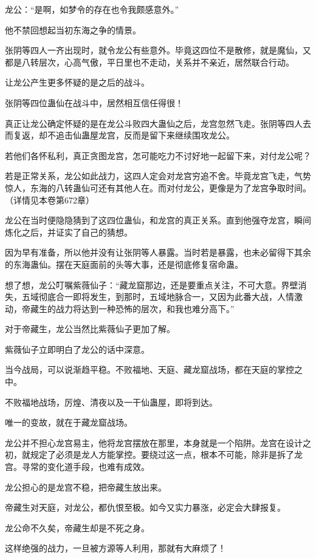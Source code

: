 \begin{this_body}
龙公：“是啊，如梦令的存在也令我颇感意外。”

他不禁回想起当初东海之争的情景。

张阴等四人一齐出现时，就令龙公有些意外。毕竟这四位不是散修，就是魔仙，又都是八转层次，心高气傲，平日里也不走动，关系并不亲近，居然联合行动。

让龙公产生更多怀疑的是之后的战斗。

张阴等四位蛊仙在战斗中，居然相互信任得很！

真正让龙公确定怀疑的是在龙公斗败四大蛊仙之后，龙宫忽然飞走。张阴等四人去而复返，却不追击仙蛊屋龙宫，反而是留下来继续围攻龙公。

若他们各怀私利，真正贪图龙宫，怎可能吃力不讨好地一起留下来，对付龙公呢？

若是正常关系，龙公如此战力，这四人定会对龙宫穷追不舍。毕竟龙宫飞走，气势惊人，东海的八转蛊仙可还有其他人在。而对付龙公，更像是为了龙宫争取时间。（详情见本卷第672章）

龙公在当时便隐隐猜到了这四位蛊仙，和龙宫的真正关系。直到他强夺龙宫，瞬间炼化之后，并证实了自己的猜想。

因为早有准备，所以他并没有让张阴等人暴露。当时若是暴露，也未必留得下其余的东海蛊仙。摆在天庭面前的头等大事，还是彻底修复宿命蛊。

想了想，龙公叮嘱紫薇仙子：“藏龙窟那边，还是要重点关注，不可大意。界壁消失，五域彻底合一即将发生，到那时，五域地脉合一，又因为此番大战，人情激动，帝藏生的战力将达到一种恐怖的层次，和我也难分高下。”

对于帝藏生，龙公当然比紫薇仙子更加了解。

紫薇仙子立即明白了龙公的话中深意。

当今战局，可以说渐趋平稳。不败福地、天庭、藏龙窟战场，都在天庭的掌控之中。

不败福地战场，厉煌、清夜以及一干仙蛊屋，即将到达。

唯一的变故，就在于藏龙窟战场。

龙公并不担心龙宫易主，他将龙宫摆放在那里，本身就是一个陷阱。龙宫在设计之初，就规定了必须是龙人方能掌控。要绕过这一点，根本不可能，除非是拆了龙宫。寻常的变化道手段，也难有成效。

龙公担心的是龙宫不稳，把帝藏生放出来。

帝藏生对天庭，对龙公，都仇恨至极。如今又实力暴涨，必定会大肆报复。

龙公命不久矣，帝藏生却是不死之身。

这样绝强的战力，一旦被方源等人利用，那就有大麻烦了！

\end{this_body}

